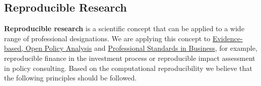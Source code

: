 \documentclass[
  a4paper,
  openany, a4paper, oneside]{book}
\begin{document}
\hypertarget{reproducible-research-theory}{%
\subsection{Reproducible Research}\label{reproducible-research-theory}}

\textbf{Reproducible research} is a scientific concept that can be applied to a wide range of professional designations. We are applying this concept to \protect\hyperlink{opa}{Evidence-based, Open Policy Analysis} and \protect\hyperlink{business-professional-standards}{Professional Standards in Business},
for example, reproducible finance in the investment process or reproducible impact assessment in policy consulting. Based on the computational reproducibility we believe that the following principles should be followed.
\end{document}
